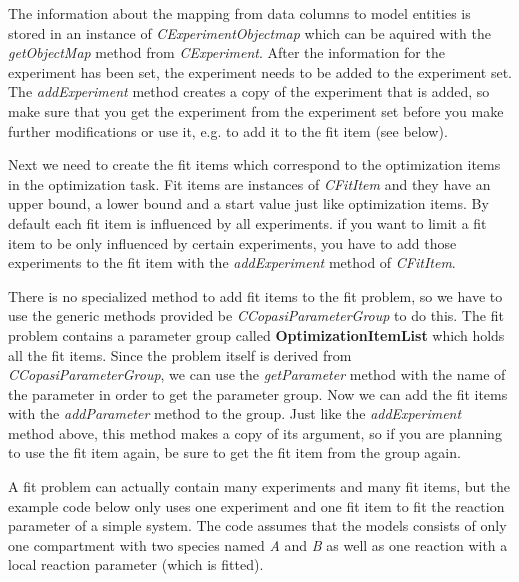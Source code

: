 \documentclass[a4,10pt]{article}
\begin{document}
The information about the mapping from data columns to model entities is stored in an instance of \textit{CExperimentObjectmap} which can be aquired with the \textit{getObjectMap} method from \textit{CExperiment}.
After the information for the experiment has been set, the experiment needs to be added to the experiment set. The \textit{addExperiment} method creates a copy of the experiment that is added, so make sure that you get the experiment from the experiment set before you make further modifications or use it, e.g. to add it to the fit item (see below).

Next we need to create the fit items which correspond to the optimization items in the optimization task. Fit items are instances of \textit{CFitItem} and they have an upper bound, a lower bound and a start value just like optimization items.
By default each fit item is influenced by all experiments. if you want to limit a fit item to be only influenced by certain experiments, you have to add those experiments to the fit item with the \textit{addExperiment} method of \textit{CFitItem}.

There is no specialized method to add fit items to the fit problem, so we have to use the generic methods provided be \textit{CCopasiParameterGroup} to do this. The fit problem contains a parameter group called \textbf{OptimizationItemList} which holds all the fit items. Since the problem itself is derived from \textit{CCopasiParameterGroup}, we can use the \textit{getParameter} method with the name of the parameter in order to get the parameter group. Now we can add the fit items with the \textit{addParameter} method to the group.
Just like the \textit{addExperiment} method above, this method makes a copy of its argument, so if you are planning to use the fit item again, be sure to get the fit item from the group again.

A fit problem can actually contain many experiments and many fit items, but the example code below only uses one experiment and one fit item to fit the reaction parameter of a simple system. The code assumes that the models consists of only one compartment with two species named \textit{A} and \textit{B} as well as one reaction with a local reaction parameter (which is fitted).
\end{document}
